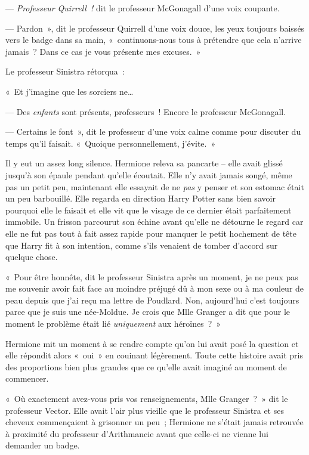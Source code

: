 --- \emph{Professeur Quirrell~!} dit le professeur McGonagall d'une voix coupante.

--- Pardon~», dit le professeur Quirrell d'une voix douce, les yeux toujours baissés vers le badge dans sa main, «~continuons-nous tous à prétendre que cela n'arrive jamais~?
Dans ce cas je vous présente mes excuses.~»

Le professeur Sinistra rétorqua~:

«~Et j'imagine que les sorciers ne…

--- Des \emph{enfants} sont présents, professeurs~!
Encore le professeur McGonagall.

--- Certains le font~», dit le professeur d'une voix calme comme pour discuter du temps qu'il faisait.
«~Quoique personnellement, j'évite.~»

Il y eut un assez long silence.
Hermione releva sa pancarte -- elle avait glissé jusqu'à son épaule pendant qu'elle écoutait.
Elle n'y avait jamais songé, même pas un petit peu, maintenant elle essayait de ne \emph{pas} y penser et son estomac était un peu barbouillé.
Elle regarda en direction Harry Potter sans bien savoir pourquoi elle le faisait et elle vit que le visage de ce dernier était parfaitement immobile.
Un frisson parcourut son échine avant qu'elle ne détourne le regard car elle ne fut pas tout à fait assez rapide pour manquer le petit hochement de tête que Harry fit à son intention, comme s'ils venaient de tomber d'accord sur quelque chose.

«~Pour être honnête, dit le professeur Sinistra après un moment, je ne peux pas me souvenir avoir fait face au moindre préjugé dû à mon sexe ou à ma couleur de peau depuis que j'ai reçu ma lettre de Poudlard.
Non, aujourd'hui c'est toujours parce que je suis une née-Moldue.
Je crois que Mlle Granger a dit que pour le moment le problème était lié \emph{uniquement} aux héroïnes~?~»

Hermione mit un moment à se rendre compte qu'on lui avait posé la question et elle répondit alors «~oui~» en couinant légèrement.
Toute cette histoire avait pris des proportions bien plus grandes que ce qu'elle avait imaginé au moment de commencer.

«~Où exactement avez-vous pris vos renseignements, Mlle Granger~?~»
dit le professeur Vector.
Elle avait l'air plus vieille que le professeur Sinistra et ses cheveux commençaient à grisonner un peu~; Hermione ne s'était jamais retrouvée à proximité du professeur d'Arithmancie avant que celle-ci ne vienne lui demander un badge.

